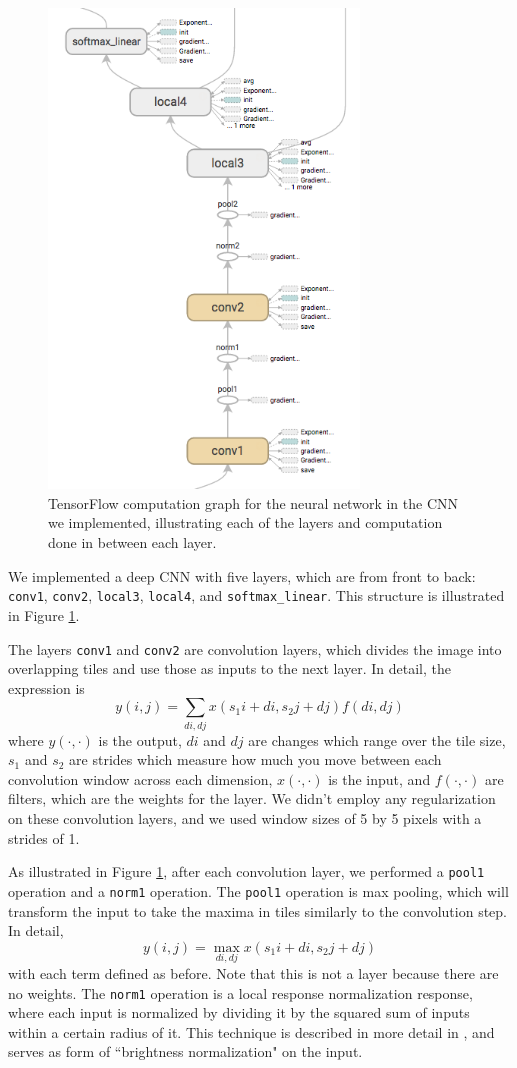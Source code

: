 \documentclass[11pt, twocolumn, twoside]{article}
\begin{document}
\begin{figure}
	\centering
	\includegraphics[width=3.25in]{inference_graph}
	\caption{TensorFlow computation graph for the neural network in the CNN we implemented, illustrating each of the layers and computation done in between each layer.}
	\label{fig:inference}
\end{figure}

We implemented a deep CNN with five layers, which are from front to back: \texttt{conv1}, \texttt{conv2}, \texttt{local3}, \texttt{local4}, and \texttt{softmax\_linear}. This structure is illustrated in Figure \ref{fig:inference}. 

The layers \texttt{conv1} and \texttt{conv2} are convolution layers, which divides the image into overlapping tiles and use those as inputs to the next layer. In detail, the expression is
\[ y(i, j) = \sum_{di, dj} x(s_1i + di, s_2j + dj) f(di, dj)\]
where $y(\cdot, \cdot)$ is the output, $di$ and $dj$ are changes which range over the tile size, $s_1$ and $s_2$ are strides which measure how much you move between each convolution window across each dimension, $x(\cdot, \cdot)$ is the input, and $f(\cdot, \cdot)$ are filters, which are the weights for the layer. We didn't employ any regularization on these convolution layers, and we used window sizes of 5 by 5 pixels with a strides of 1.

As illustrated in Figure \ref{fig:inference}, after each convolution layer, we performed a \texttt{pool1} operation and a \texttt{norm1} operation. The \texttt{pool1} operation is max pooling, which will transform the input to take the maxima in tiles similarly to the convolution step. In detail,
\[ y(i, j) = \max_{di, dj} x(s_1i + di, s_2j + dj)\]
with each term defined as before. Note that this is not a layer because there are no weights. The \texttt{norm1} operation is a local response normalization response, where each input is normalized by dividing it by the squared sum of inputs within a certain radius of it. This technique is described in more detail in \cite{Krizhevsky}, and serves as form of ``brightness normalization" on the input.
\end{document}
